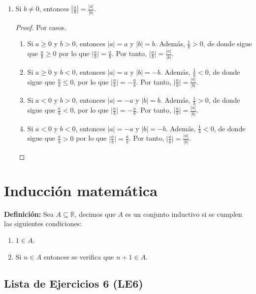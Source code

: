 \documentclass[11pt]{article}
\newcommand{\R}{\mathbb{R}}
\let\subset\subseteq
\begin{document}
\begin{enumerate}[label=\alph*)]
\item Si $b\neq 0$, entonces $\left| \frac{a}{b} \right| = \frac{|a|}{|b|}$.

\vspace{-1em}\begin{proof} Por casos.
    \begin{enumerate}[label=\roman*)]
        \item Si $a \geq 0$ y $b>0$, entonces $|a|=a$ y $|b|=b$. Además, $\frac{1}{b} >0$, de donde sigue que $\frac{a}{b} \geq 0$ por lo que $\big| \frac{a}{b} \big| = \frac{a}{b}$. Por tanto, $ \big| \frac{a}{b} \big| = \frac{|a|}{|b|}$.
        \item Si $a \geq 0$ y $b<0$, entonces $|a|=a$ y $|b|=-b$. Además, $\frac{1}{b} <0$, de donde sigue que $\frac{a}{b} \leq 0$, por lo que $\big| \frac{a}{b} \big| =- \frac{a}{b}$. Por tanto, $ \big| \frac{a}{b} \big| = \frac{|a|}{|b|}$.
        \item Si $a<0$ y $b>0$, entonces $|a|=-a$ y $|b|=b$. Además, $\frac{1}{b} >0$, de donde sigue que $\frac{a}{b} < 0$, por lo que $\big| \frac{a}{b} \big| =- \frac{a}{b}$. Por tanto, $ \big| \frac{a}{b} \big| = \frac{|a|}{|b|}$.
        \item Si $a<0$ y $b<0$, entonces $|a|=-a$ y $|b|=-b$. Además, $\frac{1}{b} <0$, de donde sigue que $\frac{a}{b} > 0$ por lo que $\big| \frac{a}{b} \big| = \frac{a}{b}$. Por tanto, $ \big| \frac{a}{b} \big| = \frac{|a|}{|b|}$.
    \end{enumerate}    
\end{proof} \vspace{-1em}

\end{enumerate}

\pagebreak

\section*{Inducción matemática}

\textbf{Definición:} Sea $A\subset \R$, decimos que $A$ es un conjunto inductivo si se cumplen las siguientes condiciones:
    \begin{enumerate}[label=\roman*)]
        \item $1 \in A$.
        \item Si $n \in A$ entonces se verifica que $n+1 \in A$.
    \end{enumerate}

\subsection*{Lista de Ejercicios 6 (LE6)}
\end{document}

